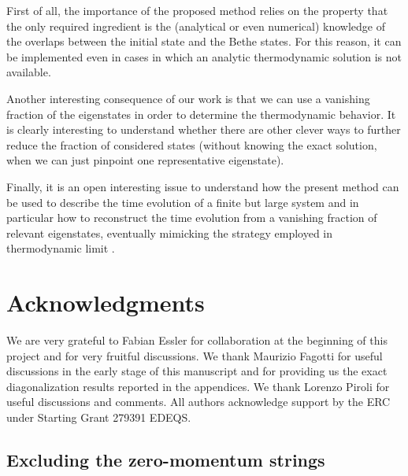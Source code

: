 \documentclass[11pt]{iopart}
\begin{document}
First of all, 
the importance of the proposed method relies on the property that the only required ingredient is the (analytical or even numerical)
knowledge of the overlaps between the initial state and the Bethe states. 
For this reason, it can be implemented even in cases in which an analytic thermodynamic solution is not 
available. 

Another interesting consequence of our work is that we can use a vanishing fraction of the eigenstates in order 
to determine the thermodynamic behavior. It is clearly interesting to understand whether there are other clever ways 
to further reduce the fraction of considered states (without knowing the exact solution, when we can just 
pinpoint one representative eigenstate). 

Finally, it is an open interesting issue to understand how the present method can be used to describe the time evolution 
of a finite but large system and in particular how to reconstruct the time evolution from a vanishing fraction of relevant 
eigenstates, eventually mimicking  the strategy employed in thermodynamic limit \cite{de-nardis-2015a,de-nardis-2015}. 


\section*{Acknowledgments}

We are very grateful to Fabian Essler for collaboration at the beginning of this project 
and for very fruitful discussions. 
We thank Maurizio Fagotti for useful discussions in the early stage of this manuscript 
and for providing us the exact diagonalization results reported in the appendices. 
We thank Lorenzo Piroli for useful discussions and comments. 
All authors acknowledge support by the ERC under Starting Grant 279391 EDEQS. 


\appendix


\subsection{Excluding the zero-momentum strings}
\label{app-1.2}
\end{document}
